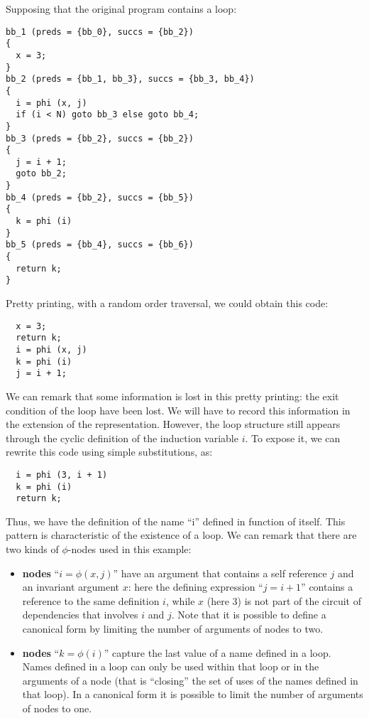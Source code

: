 Supposing that the original program contains a loop:
\begin{verbatim}
bb_1 (preds = {bb_0}, succs = {bb_2})
{
  x = 3;
}
bb_2 (preds = {bb_1, bb_3}, succs = {bb_3, bb_4})
{
  i = phi (x, j)
  if (i < N) goto bb_3 else goto bb_4;
}
bb_3 (preds = {bb_2}, succs = {bb_2})
{
  j = i + 1;
  goto bb_2;
}
bb_4 (preds = {bb_2}, succs = {bb_5})
{
  k = phi (i)
}
bb_5 (preds = {bb_4}, succs = {bb_6})
{
  return k;
}
\end{verbatim}
Pretty printing, with a random order traversal, we could obtain this
\SSA{} code:
\begin{verbatim}
  x = 3;
  return k;
  i = phi (x, j)
  k = phi (i)
  j = i + 1;
\end{verbatim}
We can remark that some information is lost in this pretty printing:
the exit condition of the loop have been lost. We will have to record
this information in the extension of the \SSA{} representation. However, the
loop structure still appears through the cyclic definition of the induction variable $i$. To expose it, we can rewrite this
\SSA{} code using simple substitutions, as:
\begin{verbatim}
  i = phi (3, i + 1)
  k = phi (i)
  return k;
\end{verbatim}
Thus, we have the definition of the \SSA{} name ``i'' defined in
function of itself.  This pattern is characteristic of the existence
of a loop.  We can remark that there are two kinds of $\phi$-nodes used in this example:
\begin{itemize}
\item {\bf \loopphi{} nodes}  ``$i = \phi (x, j)$'' have an argument that contains a self reference $j$ and an invariant argument
  $x$: here the defining expression ``$j = i + 1$'' contains a reference to
  the same \loopphi{} definition $i$, while $x$ (here $3$) is not part of the circuit of dependencies that involves $i$ and $j$. Note that it is possible to define a
  canonical \SSA{} form by limiting the number of arguments of
  \loopphi{} nodes to two.
\item {\bf \closephi{} nodes} ``$k = \phi (i)$''  capture the last value of a name defined
  in a loop.  Names defined in a loop can only be used within that
  loop or in the arguments of a \closephi{} node (that is ``closing''
  the set of uses of the names defined in that loop).  In a canonical
  \SSA{} form it is possible to limit the number of arguments of
  \closephi{} nodes to one.
\end{itemize}

